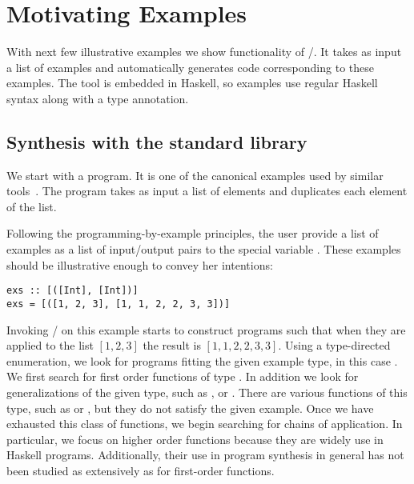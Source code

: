 \section{Motivating Examples} 
\label{examples}

With next few illustrative examples we show functionality of \ourTool/.
It takes as input a list of examples and automatically generates code
corresponding to these examples. The tool is embedded in Haskell, so examples use regular Haskell syntax along with a type annotation.



\subsection{Synthesis with the standard library}
\label{sec:exampleBasic}

We start with a  program. It is one of the canonical examples used by similar tools~\cite{Osera:2015}.
The  program takes as input a list of elements and duplicates each element of the list.
 
Following the programming-by-example principles, the user 
provide a list of examples as a list of input/output pairs to the special variable . These examples should be
illustrative enough to convey her intentions:

\begin{lstlisting}
exs :: [([Int], [Int])]
exs = [([1, 2, 3], [1, 1, 2, 2, 3, 3])]
\end{lstlisting}

Invoking \ourTool/ on this example starts to construct programs such that when they are applied to the list $[1, 2, 3]$ the result 
is $[1, 1, 2, 2, 3, 3]$.
Using a type-directed enumeration, we look for programs fitting the given example type, in this case \codeinline{[Int]->[Int]}.
We first search for first order functions of type \codeinline{[Int]->[Int]}.
In addition we look for generalizations of the given type, such as \codeinline{[a]->[a]}, or .
There are various functions of this type, such as  or , but they do not satisfy the given example.
Once we have exhausted this class of functions, we begin searching for chains of application.
In particular, we focus on higher order functions because they are widely use in Haskell programs. Additionally, their use in program synthesis 
in general has not been studied as extensively as for first-order functions.

